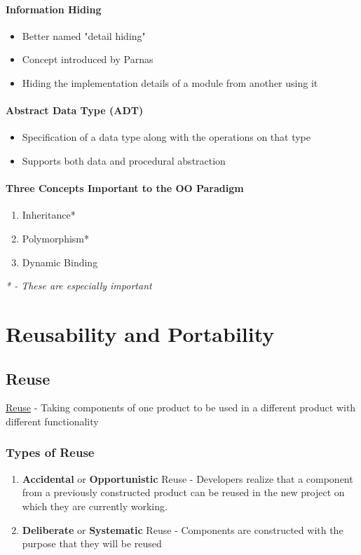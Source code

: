 \documentclass{report}
\begin{document}
				\subsubsection{Information Hiding}
					\begin{itemize}
						\item Better named "detail hiding"
						\item Concept introduced by Parnas
						\item Hiding the implementation details of a module from another using it
					\end{itemize}
				\subsubsection{Abstract Data Type (ADT)}
					\begin{itemize}
						\item Specification of a data type along with the operations on that type
						\item Supports both data and procedural abstraction
					\end{itemize}
				\subsubsection{Three Concepts Important to the OO Paradigm}
					\begin{enumerate}
						\item Inheritance*
						\item Polymorphism*
						\item Dynamic Binding
					\end{enumerate}
					\textit{* - These are especially important}
	\chapter{Reusability and Portability}
		\section{Reuse}
			\underline{Reuse} - Taking components of one product to be used in a different product with different functionality
			\subsection{Types of Reuse}
				\begin{enumerate}
					\item \textbf{Accidental} or \textbf{Opportunistic} Reuse - Developers realize that a component from a previously constructed product can be reused in the new project on which they are currently working.
					\item \textbf{Deliberate} or \textbf{Systematic} Reuse - Components are constructed with the purpose that they will be reused
				\end{enumerate}
\end{document}
